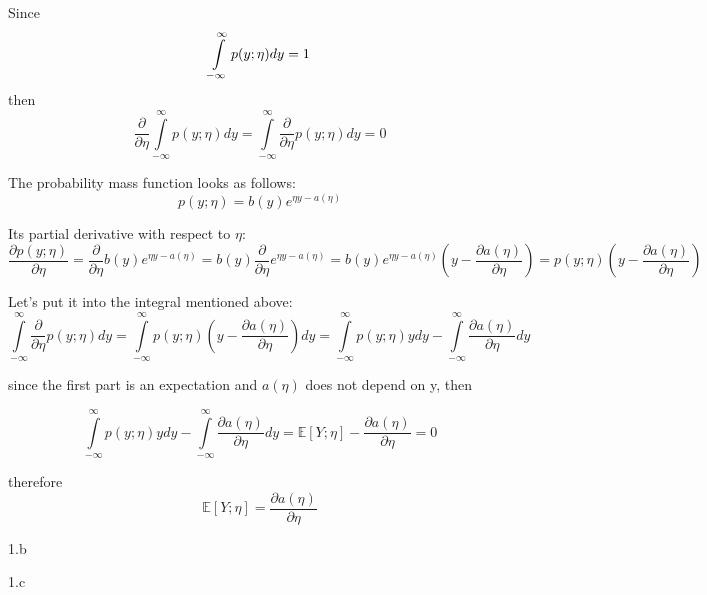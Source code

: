 \begin{answer}
  Since
  \[
  \int\limits_{-\infty}^\infty{p(y;\eta)}{dy} = 1\newline
  \]
  then
  \[
  \frac{\partial}{\partial \eta} \int\limits_{-\infty}^\infty{p(y;\eta)} dy = \int\limits_{-\infty}^\infty \frac{\partial}{\partial \eta}{p(y;\eta)}{dy} = 0
  \]
  
  The probability mass function looks as follows:
  \[
  p(y;\eta) = b(y)e^{\eta y - a(\eta)}
  \]

  Its partial derivative with respect to $\eta$:
  \[
  \frac{\partial p(y;\eta)}{\partial \eta} = \frac{\partial}{\partial \eta} b(y) e^{\eta y - a(\eta)} = b(y)\frac{\partial}{\partial \eta} e^{\eta y - a(\eta)} = b(y) e^{\eta y - a(\eta)} (y - \frac{\partial a(\eta)}{\partial \eta} ) = p(y;\eta) (y - \frac{\partial a(\eta)}{\partial \eta} )
  \]

  Let's put it into the integral mentioned above:
  \[
  \int\limits_{-\infty}^\infty \frac{\partial}{\partial \eta}{p(y;\eta)}{dy} = \int\limits_{-\infty}^\infty{p(y;\eta) (y - \frac{\partial a(\eta)}{\partial \eta} )} dy = \int\limits_{-\infty}^\infty{p(y;\eta)} ydy - \int\limits_{-\infty}^\infty{ \frac{\partial a(\eta)}{\partial \eta}} dy
  \]

  since the first part is an expectation and $a(\eta)$ does not depend on y, then

  \[
  \int\limits_{-\infty}^\infty{p(y;\eta)} ydy - \int\limits_{-\infty}^\infty{ \frac{\partial a(\eta)}{\partial \eta}} dy = \mathbb{E} [Y;\eta] - \frac{\partial a(\eta)}{\partial \eta} = 0
  \]

  therefore
  \[
  \mathbb{E} [Y;\eta] = \frac{\partial a(\eta)}{\partial \eta}
  \]
\end{answer}
\clearpage

\LARGE
1.b
\normalsize

\begin{answer}
\end{answer}
\clearpage

\LARGE
1.c
\normalsize

\begin{answer}
\end{answer}
\clearpage

